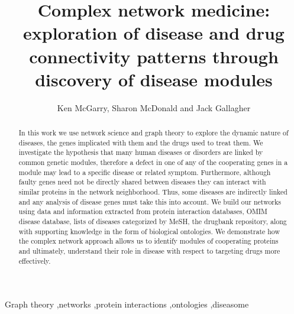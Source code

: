 \documentclass[authoryear,10pt,preprint]{elsarticle}
\begin{document}
\begin{frontmatter}
\title{Complex network medicine: exploration of disease and drug connectivity patterns through discovery of disease modules}

\author{Ken McGarry, Sharon McDonald and Jack Gallagher}
\address{School of Pharmacy and Pharmaceutical Sciences, \\University of Sunderland, City Campus, \\Sunderland, SR1 3SD, UK}

\begin{abstract}
In this work we use network science and graph theory to explore the dynamic nature of diseases, the genes implicated with them and the drugs used to treat them. We investigate the hypothesis that many human diseases or disorders are linked by common genetic modules, therefore a defect in one of any of the cooperating genes in a module may lead to a specific disease or related symptom. Furthermore, although faulty genes need not be directly shared between diseases they can interact with similar proteins in the network neighborhood. Thus, some diseases are indirectly linked and any analysis of disease genes must take this into account. We build our networks using data and information extracted from protein interaction databases, OMIM disease database, lists of diseases categorized by MeSH, the drugbank repository, along with supporting knowledge in the form of biological ontologies. We demonstrate how the complex network approach allows us to identify modules of cooperating proteins and ultimately, understand their role in disease with respect to targeting drugs more effectively. 
\end{abstract}

\begin{keyword}
Graph theory \sep networks \sep protein interactions \sep ontologies \sep diseasome
\end{keyword}

\end{frontmatter}
\end{document}
